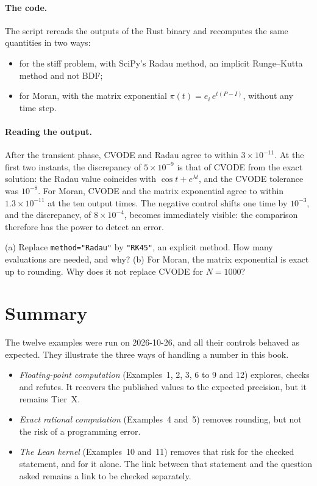 \paragraph{The code.} The script rereads the outputs of the Rust binary and recomputes the same quantities in two ways:
\begin{itemize}
\item for the stiff problem, with SciPy's Radau method, an implicit Runge--Kutta method and not BDF;
\item for Moran, with the matrix exponential $\pi(t)=e_i\,e^{t(P-I)}$, without any time step.
\end{itemize}


\paragraph{Reading the output.} After the transient phase, CVODE and Radau agree to within $3\times10^{-11}$. At the
first two instants, the discrepancy of $5\times10^{-9}$ is that of CVODE from the exact solution: the Radau value
coincides with $\cos t+e^{\lambda t}$, and the CVODE tolerance was $10^{-8}$. For Moran, CVODE and the matrix exponential
agree to within $1.3\times10^{-11}$ at the ten output times. The negative control shifts one time by $10^{-3}$, and the
discrepancy, of $8\times10^{-4}$, becomes immediately visible: the comparison therefore has the power to detect an
error.

\begin{exercise}[Example 12]\label{appF:exo12}
(a) Replace \texttt{method="Radau"} by \texttt{"RK45"}, an explicit method. How many evaluations are needed, and why?
(b) For Moran, the matrix exponential is exact up to rounding. Why does it not replace CVODE for $N=1000$?
\end{exercise}

\section{Summary}\label{appF:bilan}

The twelve examples were run on 2026-10-26, and all their controls behaved as expected. They illustrate the three ways
of handling a number in this book.
\begin{itemize}
\item \emph{Floating-point computation} (Examples~1, 2, 3, 6 to 9 and 12) explores, checks and refutes. It recovers the
published values to the expected precision, but it remains Tier~X.
\item \emph{Exact rational computation} (Examples~4 and~5) removes rounding, but not the risk of a programming error.
\item \emph{The Lean kernel} (Examples~10 and~11) removes that risk for the checked statement, and for it alone. The link
between that statement and the question asked remains a link to be checked separately.
\end{itemize}
